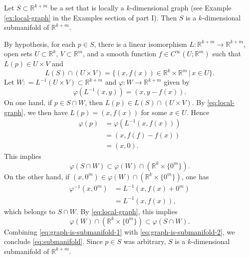 \documentclass{ximera}
\begin{document}
    \begin{example}
        Let $S \subset \mathbb{R}^{k + m }$ be a set that is locally a $k$-dimensional graph (see Example \ref{ex:local-graph} in the Examples section of part I). Then $S$ is a $k$-dimensional submanifold of $\mathbb{R}^{k+m}$.   

    \begin{solution}
        By hypothesis, for each $p \in S$, there is a linear isomorphism $L : \mathbb{R}^{k+m} \to \mathbb{R}^{k+m}$, open sets $U \subset \mathbb{R}^k $, $V \subset \mathbb{R}^m$, and a smooth function $f \in C^{\infty}(U ; \mathbb{R}^m)$ such that $L(p) \in U \times V$ and 
        \begin{equation}\label{eq:local-graph}
           L (S ) \cap (U \times V)  = \{ (x, f(x) ) \in \mathbb{R}^k \times \mathbb{R}^m \, \vert \, x \in U \}  .    
        \end{equation}
        Let $W : = L ^{-1} ( U \times V ) \subset \mathbb{R}^{k + m } $ and $\varphi : W \to \mathbb{R}^{k + m}$ given by 
        \[     \varphi ( L^{-1} (x, y ) ) = (x , y - f (x ) ).                     \]
        On one hand, if $p \in S \cap  W $, then $L(p) \in L(S ) \cap (U \times V )$. By \eqref{eq:local-graph}, we then have  $L (p ) = (x,f(x)) $ for some $x \in U$. Hence
        \begin{align*}
            \varphi (p) & = \varphi ( L^{-1} (x, f(x)) ) \\
            & = (x , f(f) - f(x)) \\
            & = (x,0). 
        \end{align*}
        This implies  
        \begin{equation}\label{eq:graph-is-submanifold-1}
            \varphi (S \cap W) \subset \varphi (W) \cap (\mathbb{R}^k \times \{ 0 ^m\}). 
        \end{equation}
        On the other hand, if $(x,0^{m}) \in  \varphi (W )  \cap ( \mathbb{R}^k  \times  \{ 0^{m} \}  )$, one has 
        \begin{align*}
            \varphi ^{-1} (x, 0 ^m ) & = L^{-1} (x , f(x) + 0 ^m) \\
            & = L^{-1} (x, f(x)) ,
        \end{align*}
        which belongs to $S \cap W$. By \eqref{eq:local-graph}, this implies 
        \begin{equation}\label{eq:graph-is-submanifold-2}
             \varphi ( W)  \cap (\mathbb{R}^k \times \{ 0 ^m\}) \subset  \varphi (S \cap W ).
        \end{equation}
        Combining \eqref{eq:graph-is-submanifold-1} with \eqref{eq:graph-is-submanifold-2}, we conclude \eqref{eq:submanifold}. Since $p\in S$ was arbitrary,  $S$ is a $k$-dimensional submanifold of $\mathbb{R}^{k + m}$.
    \end{solution}
    \end{example}
\end{document}
